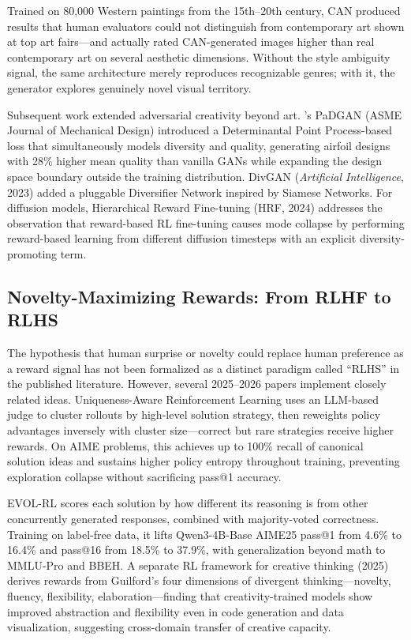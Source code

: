 \documentclass[12pt,a4paper]{article}
\begin{document}
Trained on 80,000 Western paintings from the 15th--20th century, CAN produced results that human evaluators could not distinguish from contemporary art shown at top art fairs---and actually rated CAN-generated images higher than real contemporary art on several aesthetic dimensions. Without the style ambiguity signal, the same architecture merely reproduces recognizable genres; with it, the generator explores genuinely novel visual territory.

Subsequent work extended adversarial creativity beyond art. \citet{chen2021padgan}'s PaDGAN (ASME Journal of Mechanical Design) introduced a Determinantal Point Process-based loss that simultaneously models diversity and quality, generating airfoil designs with 28\% higher mean quality than vanilla GANs while expanding the design space boundary outside the training distribution. DivGAN (\emph{Artificial Intelligence}, 2023) added a pluggable Diversifier Network inspired by Siamese Networks. For diffusion models, Hierarchical Reward Fine-tuning (HRF, 2024) addresses the observation that reward-based RL fine-tuning causes mode collapse by performing reward-based learning from different diffusion timesteps with an explicit diversity-promoting term.

\subsection{Novelty-Maximizing Rewards: From RLHF to RLHS}
The hypothesis that human surprise or novelty could replace human preference as a reward signal has not been formalized as a distinct paradigm called ``RLHS'' in the published literature. However, several 2025--2026 papers implement closely related ideas. Uniqueness-Aware Reinforcement Learning \citep{hu2026} uses an LLM-based judge to cluster rollouts by high-level solution strategy, then reweights policy advantages inversely with cluster size---correct but rare strategies receive higher rewards. On AIME problems, this achieves up to 100\% recall of canonical solution ideas and sustains higher policy entropy throughout training, preventing exploration collapse without sacrificing pass@1 accuracy.

EVOL-RL \citep{zhou2025evolrl} scores each solution by how different its reasoning is from other concurrently generated responses, combined with majority-voted correctness. Training on label-free data, it lifts Qwen3-4B-Base AIME25 pass@1 from 4.6\% to 16.4\% and pass@16 from 18.5\% to 37.9\%, with generalization beyond math to MMLU-Pro and BBEH. A separate RL framework for creative thinking (2025) derives rewards from Guilford's four dimensions of divergent thinking---novelty, fluency, flexibility, elaboration---finding that creativity-trained models show improved abstraction and flexibility even in code generation and data visualization, suggesting cross-domain transfer of creative capacity.
\end{document}

